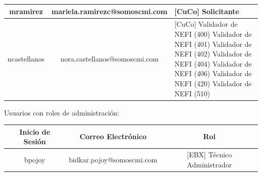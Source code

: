 \begin{longtable}{|c|c|p{7cm}|}
        \hline
        mramirez & mariela.ramirezc@somoscmi.com & [CuCo] Solicitante  \\
        \hline
        ncastellanos & nora.castellanos@somoscmi.com & 
        [CuCo] Validador de NEFI (400) \newline
        [CuCo] Validador de NEFI (401) \newline
        [CuCo] Validador de NEFI (402) \newline
        [CuCo] Validador de NEFI (404) \newline
        [CuCo] Validador de NEFI (406) \newline
        [CuCo] Validador de NEFI (420) \newline
        [CuCo] Validador de NEFI (510) \newline \\
        \hline


\end{longtable}

Usuarios con roles de administración:

\begin{table}[H]
    \centering
    \begin{tabular}{|c|c|c|}
        \hline
        Inicio de Sesión & Correo Electrónico & Rol \\
        \hline
        bpojoy & bidkar.pojoy@somoscmi.com & [EBX] Técnico Administrador \\ 
        \hline
    \end{tabular}
\end{table}
